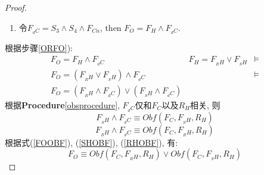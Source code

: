 \begin{proof}
\begin{enumerate}
\item\label{ORFO}
令$F_{_dC} =S_3\wedge S_4 \wedge F_{Cn}$, then $F_O=F_H \wedge F_{_dC}$.
\end{enumerate}
根据步骤\ref{ORFO}):
\begin{equation}\label{FOOBF}
\begin{array}{ccc}
F_O  =  F_H \wedge F_{_dC}                                   &F_H=F_{_RH}\vee F_{_SH}&\models\\
F_O  =  (F_{_RH}\vee F_{_SH})\wedge F_{_dC}                  &                       &\models\\
F_O  =  (F_{_RH} \wedge F_{_dC})\vee(F_{_SH}\wedge F_{_dC})  &                       &
\end{array}
\end{equation}
根据\textbf{Procedure}\ref{obsprocedure}, $F_{_dC}$仅和$F_C$以及$R_H$相关, 则\\
\begin{equation}\label{SHOBF}
F_{_SH} \wedge F_{_dC} \equiv Obf(F_C,F_{_SH},R_H)
\end{equation}
\begin{equation}\label{RHOBF}
F_{_RH} \wedge F_{_dC} \equiv Obf(F_C,F_{_RH},R_H)
\end{equation}
根据式(\ref{FOOBF}), (\ref{SHOBF}), (\ref{RHOBF}), 有:
 \begin{equation}
F_O \equiv Obf(F_C,F_{_RH} ,R_H)
\vee Obf(F_C,F_{_SH} ,R_H)
 \end{equation}

\end{proof}

